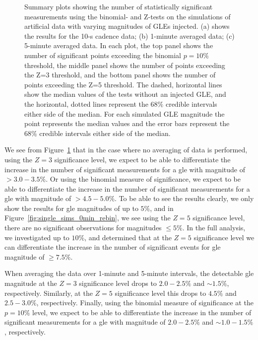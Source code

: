 \begin{figure}[!htbp!]
	\caption{Summary plots showing the number of statistically significant measurements using the binomial- and Z-tests on the simulations of artificial data with varying magnitudes of GLEs injected. (a) shows the results for the 10-s cadence data; (b) 1-minute averaged data; (c) 5-minute averaged data. In each plot, the top panel shows the number of significant points exceeding the binomial $p = 10 \%$ threshold, the middle panel shows the number of points exceeding the Z=3 threshold, and the bottom panel shows the number of points exceeding the Z=5 threshold. The dashed, horizontal lines show the median values of the tests without an injected GLE, and the horizontal, dotted lines represent the $68 \%$ credible intervals either side of the median. For each simulated GLE magnitude the point represents the median values and the error bars represent the $68 \%$ credible intervals either side of the median.}
	\label{fig:single_HS14008_sims}
\end{figure}

We see from Figure~\ref{fig:single_HS14008_sims} that in the case where no averaging of data is performed, using the $Z=3$ significance level, we expect to be able to differentiate the increase in the number of significant measurements for a \gls{gle} with magnitude of $> 3.0 - 3.5 \%$. Or using the binomial measure of significance, we expect to be able to differentiate the increase in the number of significant measurements for a \gls{gle} with magnitude of $> 4.5 - 5.0 \%$. To be able to see the results clearly, we only show the results for \gls{gle} magnitudes of up to $5\%$, and in Figure~\ref{fig:single_sims_0min_rebin}, we see using the $Z=5$ significance level, there are no significant observations for magnitudes $\leq 5\%$. In the full analysis, we investigated up to $10\%$, and determined that at the $Z=5$ significance level we can differentiate the increase in the number of significant events for \gls{gle} magnitude of $\geq 7.5\%$.

When averaging the data over 1-minute and 5-minute intervals, the detectable \gls{gle} magnitude at the $Z=3$ significance level drops to $2.0 - 2.5 \%$ and $\sim 1.5 \%$, respectively. Similarly, at the $Z=5$ significance level this drops to $4.5\%$ and $2.5 - 3.0 \%$, respectively. Finally, using the binomial measure of significance at the $p = 10 \%$ level, we expect to be able to differentiate the increase in the number of significant measurements for a \gls{gle} with magnitude of $2.0 - 2.5 \%$ and $\sim 1.0 - 1.5 \%$, respectively.

